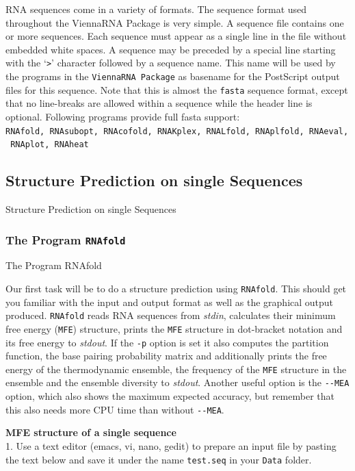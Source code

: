 \documentclass[]{article}
\begin{document}
RNA sequences come in a variety of formats. The sequence format used
throughout the ViennaRNA Package is very simple. A sequence file
contains one or more sequences. Each sequence must appear as a single
line in the file without embedded white spaces. A sequence may be
preceded by a special line starting with the `\texttt{\textgreater{}}'
character followed by a sequence name. This name will be used by the
programs in the \texttt{ViennaRNA\ Package} as basename for the
PostScript output files for this sequence. Note that this is almost the
\texttt{fasta} sequence format, except that no line-breaks are allowed
within a sequence while the header line is optional. Following programs
provide full fasta support:
\texttt{RNAfold,\ RNAsubopt,\ RNAcofold,\ RNAKplex,\ RNALfold,\ RNAplfold,\ RNAeval,\ RNAplot,\ RNAheat}

\subsection{Structure Prediction on single Sequences}{Structure Prediction on single Sequences}\label{structure-prediction-on-single-sequences}

\subsubsection{The Program \texttt{RNAfold}}{The Program RNAfold}\label{the-program-rnafold}

Our first task will be to do a structure prediction using
\texttt{RNAfold}. This should get you familiar with the input and output
format as well as the graphical output produced. \texttt{RNAfold} reads
RNA sequences from \emph{stdin}, calculates their minimum free energy
(\texttt{MFE}) structure, prints the \texttt{MFE} structure in
dot-bracket notation and its free energy to \emph{stdout}. If the
\texttt{-p} option is set it also computes the partition function, the
base pairing probability matrix and additionally prints the free energy
of the thermodynamic ensemble, the frequency of the \texttt{MFE}
structure in the ensemble and the ensemble diversity to \emph{stdout}.
Another useful option is the \texttt{-\/-MEA} option, which also shows
the maximum expected accuracy, but remember that this also needs more
CPU time than without \texttt{-\/-MEA}.

\textbf{MFE structure of a single sequence}\\
1. Use a text editor (emacs, vi, nano, gedit) to prepare an input file by
pasting the text below and save it under the name \texttt{test.seq} in
your \texttt{Data} folder.
\end{document}
